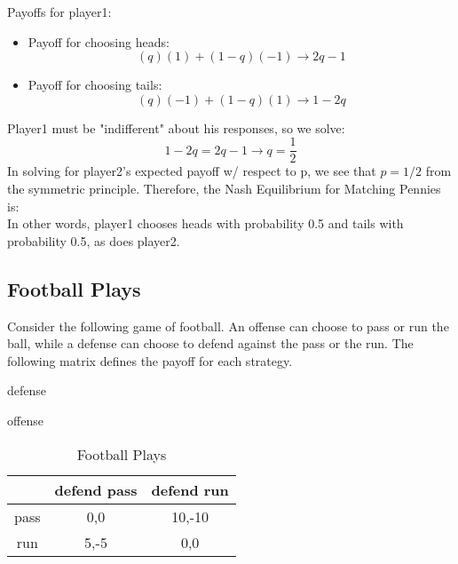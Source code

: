 \documentclass[twoside]{article}
\begin{document}
Payoffs for player1:
\begin{itemize}
    \item Payoff for choosing heads:
    \begin{equation}
        (q)(1) + (1-q)(-1) \rightarrow 2q - 1
    \end{equation}
    \item Payoff for choosing tails:
    \begin{equation}
        (q)(-1) + (1-q)(1) \rightarrow 1 - 2q
    \end{equation}
\end{itemize}

Player1 must be "indifferent" about his responses, so we solve:
\begin{equation}
    1 - 2q = 2q - 1 \rightarrow q = \frac{1}{2}
\end{equation}
In solving for player2's expected payoff w/ respect to p, we see that $p=1/2$ from the symmetric principle. Therefore, the Nash Equilibrium for Matching Pennies is:
\begin{equation}
    [ (\frac{1}{2}, \frac{1}{2}), (\frac{1}{2}, \frac{1}{2}) ]
\end{equation}
In other words, player1 chooses heads with probability 0.5 and tails with probability 0.5, as does player2.
\pagebreak

\subsection{Football Plays}
Consider the following game of football. An offense can choose to pass or run the ball, while a defense can choose to defend against the pass or the run. The following matrix defines the payoff for each strategy.

\vspace{4mm}
\centerline{\hspace{2cm}defense}
\begin{table}[h]
    \centering
    offense\hspace{4mm}
    \begin{tabular}{|c|c|c|}
        \hline
        & defend pass & defend run \\
        \hline
        pass & 0,0 & 10,-10 \\
        \hline
        run & 5,-5 & 0,0 \\
        \hline
    \end{tabular}
    \caption{Football Plays}
    \label{tab:footballPlays}
\end{table}
\end{document}
